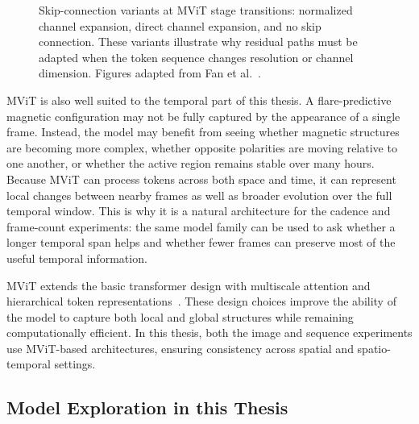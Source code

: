 \begin{figure}[H]
\centering
\begin{minipage}{0.31\linewidth}
\centering
{}
\end{minipage}
\hfill
\begin{minipage}{0.31\linewidth}
\centering
{}
\end{minipage}
\hfill
\begin{minipage}{0.31\linewidth}
\centering
{}
\end{minipage}
\caption{Skip-connection variants at MViT stage transitions: normalized channel expansion, direct channel expansion, and no skip connection. These variants illustrate why residual paths must be adapted when the token sequence changes resolution or channel dimension. Figures adapted from Fan et al.~\cite{ref_mvit}.}
\label{fig:intro_mvit_skip}
\end{figure}

MViT is also well suited to the temporal part of this thesis. A flare-predictive magnetic configuration may not be fully captured by the appearance of a single frame. Instead, the model may benefit from seeing whether magnetic structures are becoming more complex, whether opposite polarities are moving relative to one another, or whether the active region remains stable over many hours. Because MViT can process tokens across both space and time, it can represent local changes between nearby frames as well as broader evolution over the full temporal window. This is why it is a natural architecture for the cadence and frame-count experiments: the same model family can be used to ask whether a longer temporal span helps and whether fewer frames can preserve most of the useful temporal information.

MViT extends the basic transformer design with multiscale attention and hierarchical token representations~\cite{ref_mvit}. These design choices improve the ability of the model to capture both local and global structures while remaining computationally efficient. In this thesis, both the image and sequence experiments use MViT-based architectures, ensuring consistency across spatial and spatio-temporal settings.

\subsection{Model Exploration in this Thesis}

